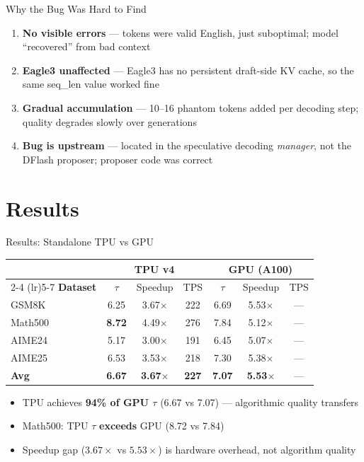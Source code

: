 \documentclass[10pt]{beamer}
\begin{document}
\begin{frame}{Why the Bug Was Hard to Find}
\begin{enumerate}
  \item \textbf{No visible errors} --- tokens were valid English, just suboptimal; model ``recovered'' from bad context
  \item \textbf{Eagle3 unaffected} --- Eagle3 has no persistent draft-side KV cache, so the same seq\_len value worked fine
  \item \textbf{Gradual accumulation} --- 10--16 phantom tokens added per decoding step; quality degrades slowly over generations
  \item \textbf{Bug is upstream} --- located in the speculative decoding \emph{manager}, not the DFlash proposer; proposer code was correct
\end{enumerate}
\end{frame}

\section{Results}

\begin{frame}{Results: Standalone TPU vs GPU}
\centering
\footnotesize
\setlength{\tabcolsep}{3.5pt}
\begin{tabular}{l ccc ccc}
\toprule
& \multicolumn{3}{c}{\textbf{TPU v4}} & \multicolumn{3}{c}{\textbf{GPU (A100)}} \\
\cmidrule(lr){2-4} \cmidrule(lr){5-7}
\textbf{Dataset} & $\tau$ & Speedup & TPS & $\tau$ & Speedup & TPS \\
\midrule
GSM8K   & 6.25 & 3.67$\times$ & 222 & 6.69 & 5.53$\times$ & --- \\
\rowcolor{rowgreen}
Math500 & \textbf{8.72} & 4.49$\times$ & 276 & 7.84 & 5.12$\times$ & --- \\
AIME24  & 5.17 & 3.00$\times$ & 191 & 6.45 & 5.07$\times$ & --- \\
AIME25  & 6.53 & 3.53$\times$ & 218 & 7.30 & 5.38$\times$ & --- \\
\midrule
\textbf{Avg} & \textbf{6.67} & \textbf{3.67$\times$} & \textbf{227} & \textbf{7.07} & \textbf{5.53$\times$} & --- \\
\bottomrule
\end{tabular}

\vspace{0.8em}
\begin{itemize}
  \item TPU achieves \textbf{94\% of GPU $\tau$} (6.67 vs 7.07) --- algorithmic quality transfers
  \item Math500: TPU $\tau$ \textbf{exceeds} GPU (8.72 vs 7.84)
  \item Speedup gap ($3.67\times$ vs $5.53\times$) is hardware overhead, not algorithm quality
\end{itemize}
\end{frame}
\end{document}
